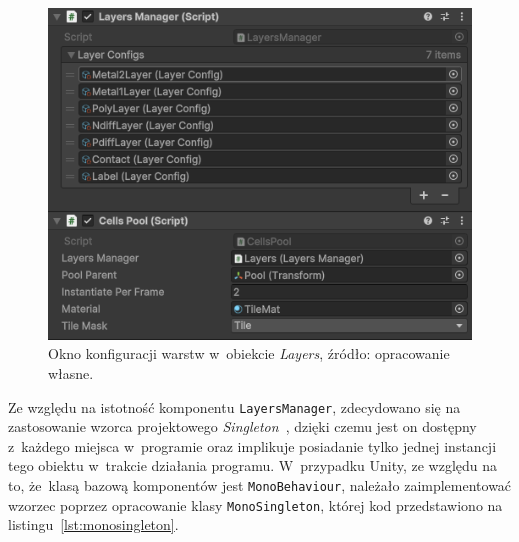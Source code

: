 \begin{figure}[h]
    \centering
    \includegraphics[width=.9\textwidth]{chapters/chapter4/rys/layers}
    \caption[Okno konfiguracji warstw w~obiekcie \textit{Layers}.]
    {Okno konfiguracji warstw w~obiekcie \textit{Layers}, źródło: opracowanie własne.}
    \label{fig:layers}
\end{figure}

Ze względu na istotność komponentu \texttt{LayersManager},
zdecydowano się na zastosowanie wzorca projektowego \textit{Singleton}~\cite{unity_csharp},
dzięki czemu jest on dostępny z~każdego miejsca w~programie
oraz implikuje posiadanie tylko jednej instancji tego obiektu w~trakcie działania programu.
W~przypadku Unity, ze względu na to, że~klasą bazową komponentów jest \texttt{MonoBehaviour},
należało zaimplementować wzorzec poprzez opracowanie klasy \texttt{MonoSingleton},
której kod przedstawiono na listingu~\ref{lst:monosingleton}.


